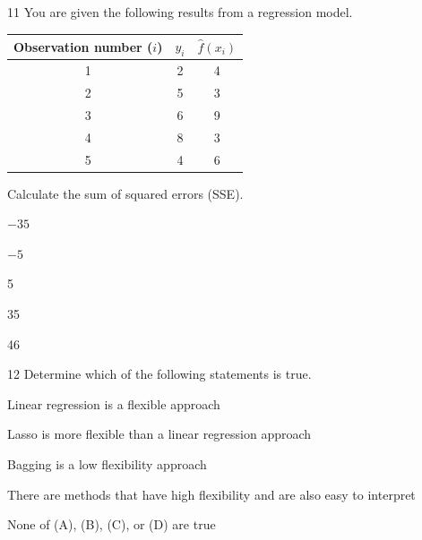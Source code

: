 \begin{question}{11}
You are given the following results from a regression model.

\begin{center}
\begin{tabular}{|c|c|c|}
\hline
Observation number ($i$) & $y_i$ & $\hat{f}(x_i)$ \\ \hline
1 & 2 & 4 \\ \hline
2 & 5 & 3 \\ \hline
3 & 6 & 9 \\ \hline
4 & 8 & 3 \\ \hline
5 & 4 & 6 \\ \hline
\end{tabular}
\end{center}

Calculate the sum of squared errors (SSE).

\begin{choices}
\item $-35$
\item $-5$
\item 5
\item 35
\item 46
\end{choices}
\end{question}

\begin{question}{12}
Determine which of the following statements is true.

\begin{choices}
\item Linear regression is a flexible approach
\item Lasso is more flexible than a linear regression approach
\item Bagging is a low flexibility approach
\item There are methods that have high flexibility and are also easy to interpret
\item None of (A), (B), (C), or (D) are true
\end{choices}
\end{question}

